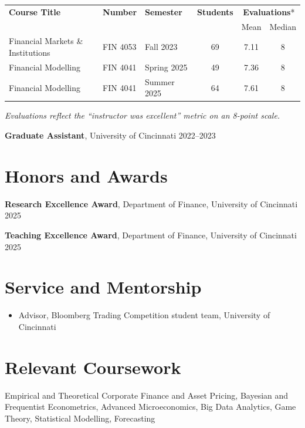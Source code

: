 \documentclass[11pt]{article}
\begin{document}
\vspace{4pt}
\noindent\begin{tabular}{@{} l l l c | c c @{}}
\textbf{Course Title} & \textbf{Number} & \textbf{Semester} & \textbf{Students} & \multicolumn{2}{c}{\textbf{Evaluations}*} \\
 & & & & Mean & Median \\[2pt]
\hline
Financial Markets \& Institutions & FIN 4053 & Fall 2023 & 69 & 7.11 & 8 \\
Financial Modelling & FIN 4041 & Spring 2025 & 49 & 7.36 & 8 \\
Financial Modelling & FIN 4041 & Summer 2025 & 64 & 7.61 & 8 \\
\end{tabular}

\vspace{2pt}
{\small \textit{Evaluations reflect the ``instructor was excellent'' metric on an 8-point scale.}}

\vspace{6pt}
\noindent\textbf{Graduate Assistant}, University of Cincinnati \hfill 2022--2023

\section*{Honors and Awards}

\noindent\textbf{Research Excellence Award}, Department of Finance, University of Cincinnati \hfill 2025

\vspace{4pt}
\noindent\textbf{Teaching Excellence Award}, Department of Finance, University of Cincinnati \hfill 2025

\section*{Service and Mentorship}

\begin{itemize}[nosep, topsep=2pt, leftmargin=1.5em]
  \item Advisor, Bloomberg Trading Competition student team, University of Cincinnati
\end{itemize}

\section*{Relevant Coursework}

\noindent Empirical and Theoretical Corporate Finance and Asset Pricing, Bayesian and Frequentist Econometrics, Advanced Microeconomics, Big Data Analytics, Game Theory, Statistical Modelling, Forecasting
\end{document}
